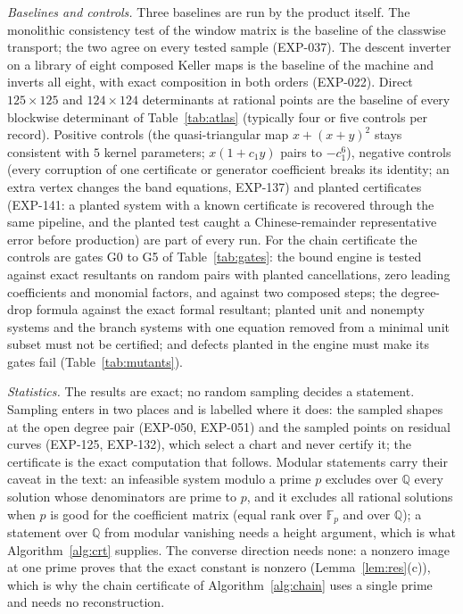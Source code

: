 \documentclass[11pt]{article}
\theoremstyle{remark}
\newcommand{\Q}{\mathbb{Q}}
\begin{document}
\emph{Baselines and controls.} Three baselines are run by the product itself. The monolithic consistency test of the window
matrix is the baseline of the classwise transport; the two agree on every tested sample (EXP-037). The descent inverter on a library of eight
composed Keller maps is the baseline of the machine and inverts all eight, with exact composition in both orders (EXP-022).
Direct $125\times125$ and $124\times124$ determinants at rational points are the baseline of every blockwise determinant of
Table~\ref{tab:atlas} (typically four or five controls per record). Positive controls (the quasi-triangular map $x+(x+y)^2$ stays
consistent with $5$ kernel parameters; $x(1+c_1y)$ pairs to $-c_1^6$), negative controls (every corruption of one certificate or
generator coefficient breaks its identity; an extra vertex changes the band equations, EXP-137) and planted certificates
(EXP-141: a planted system with a known certificate is recovered through the same pipeline, and the planted test caught a
Chinese-remainder representative error before production) are part of every run. For the chain certificate the controls are gates G0 to G5 of Table~\ref{tab:gates}: the bound engine
is tested against exact resultants on random pairs with planted cancellations, zero leading coefficients and monomial factors, and against two composed steps; the degree-drop formula against
the exact formal resultant; planted unit and nonempty systems and the branch systems with one equation removed from a minimal unit subset must not be certified; and defects planted in the engine must make its gates fail (Table~\ref{tab:mutants}).

\emph{Statistics.} The results are exact; no random sampling decides a statement. Sampling enters in two places and is labelled
where it does: the sampled shapes at the open degree pair (EXP-050, EXP-051) and the sampled points on residual curves (EXP-125, EXP-132),
which select a chart and never certify it; the certificate is the exact computation that follows. Modular statements carry their
caveat in the text: an infeasible system modulo a prime $p$ excludes over $\Q$ every solution whose denominators are prime to $p$, and
it excludes all rational solutions when $p$ is good for the coefficient matrix (equal rank over $\mathbb F_p$ and over $\Q$); a statement over $\Q$
from modular vanishing needs a height argument, which is what Algorithm~\ref{alg:crt} supplies. The converse direction needs none: a nonzero image at one prime proves
that the exact constant is nonzero (Lemma~\ref{lem:res}(c)), which is why the chain certificate of Algorithm~\ref{alg:chain} uses a single prime and needs no reconstruction.
\end{document}
